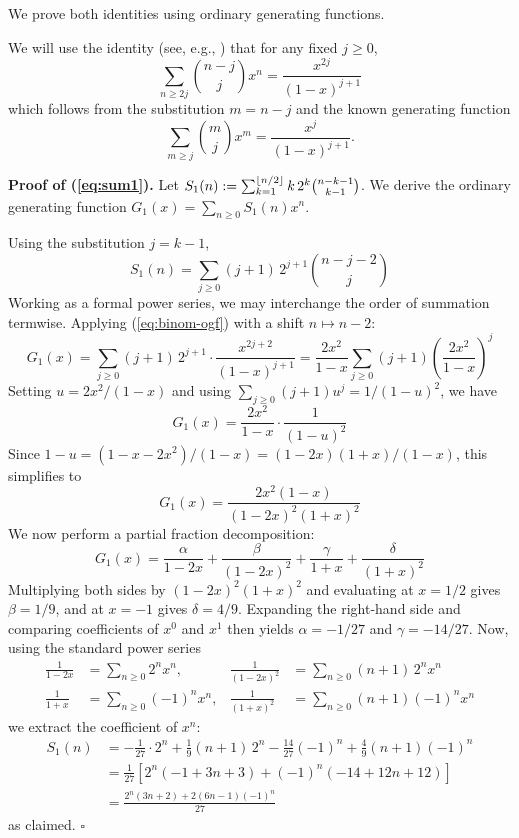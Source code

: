 \documentclass[11pt]{article}
\DeclarePairedDelimiter\floor{\lfloor}{\rfloor}
\begin{document}
We prove both identities using ordinary generating functions.

We will use the identity (see, e.g., \cite[\S 1.2]{wilf2006}) that for any fixed $j \ge 0$,
\begin{equation}\label{eq:binom-ogf}
\sum_{n \ge 2j} \binom{n-j}{j} x^n = \frac{x^{2j}}{(1-x)^{j+1}}
\end{equation}
which follows from the substitution $m = n - j$ and the known generating function
\[
\sum_{m \ge j} \binom{m}{j} x^m = \frac{x^j}{(1-x)^{j+1}}.
\]

\textbf{Proof of (\ref{eq:sum1}).} Let $S_1(n) := \sum_{k=1}^{\floor{n/2}} k\, 2^k \binom{n-k-1}{k-1}$. We derive the ordinary generating function $G_1(x) = \sum_{n \ge 0} S_1(n) x^n$.

Using the substitution $j = k - 1$,
\[
S_1(n) = \sum_{j \ge 0} (j+1)\, 2^{j+1} \binom{n - j - 2}{j}
\]
Working as a formal power series, we may interchange the order of summation termwise. Applying (\ref{eq:binom-ogf}) with a shift $n \mapsto n - 2$:
\[
G_1(x) = \sum_{j \ge 0}(j+1)\, 2^{j+1} \cdot \frac{x^{2j+2}}{(1-x)^{j+1}}
= \frac{2x^2}{1-x} \sum_{j \ge 0} (j+1) \left( \frac{2x^2}{1-x} \right)^j
\]
Setting $u = 2x^2/(1-x)$ and using $\sum_{j \ge 0}(j+1) u^j = 1/(1-u)^2$, we have
\[
G_1(x) = \frac{2x^2}{1-x} \cdot \frac{1}{(1-u)^2}
\]
Since $1 - u = (1 - x - 2x^2)/(1-x) = (1-2x)(1+x)/(1-x)$, this simplifies to
\[
G_1(x) = \frac{2x^2(1-x)}{(1-2x)^2(1+x)^2}
\]
We now perform a partial fraction decomposition:
\[
G_1(x) = \frac{\alpha}{1-2x} + \frac{\beta}{(1-2x)^2} + \frac{\gamma}{1+x} + \frac{\delta}{(1+x)^2}
\]
Multiplying both sides by $(1-2x)^2(1+x)^2$ and evaluating at $x = 1/2$ gives $\beta = 1/9$, and at $x = -1$ gives $\delta = 4/9$. Expanding the right-hand side and comparing coefficients of $x^0$ and $x^1$ then yields $\alpha = -1/27$ and $\gamma = -14/27$. Now, using the standard power series
\begin{align*}
\frac{1}{1-2x} &= \sum_{n \ge 0} 2^n x^n, &
\frac{1}{(1-2x)^2} &= \sum_{n \ge 0} (n+1)\, 2^n x^n \\
\frac{1}{1+x} &= \sum_{n \ge 0} (-1)^n x^n, &
\frac{1}{(1+x)^2} &= \sum_{n \ge 0} (n+1)(-1)^n x^n
\end{align*}
we extract the coefficient of $x^n$:
\begin{align*}
S_1(n) &= -\frac{1}{27} \cdot 2^n + \frac{1}{9}(n+1)\, 2^n - \frac{14}{27}(-1)^n + \frac{4}{9}(n+1)(-1)^n \\
&= \frac{1}{27}\left[ 2^n(-1 + 3n + 3) + (-1)^n(-14 + 12n + 12) \right] \\
&= \frac{2^n(3n+2) + 2(6n-1)(-1)^n}{27}
\end{align*}
as claimed. $\square$
\end{document}

